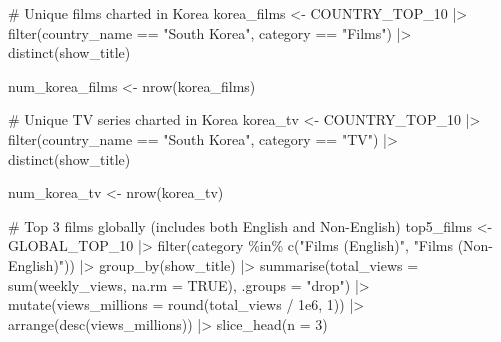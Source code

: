 \documentclass[
  12pt,
  letterpaper,
  DIV=11,
  numbers=noendperiod]{scrartcl}
\newenvironment{Shaded}{\begin{snugshade}}{\end{snugshade}}
\newcommand{\AttributeTok}[1]{\textcolor[rgb]{0.40,0.45,0.13}{#1}}
\newcommand{\CommentTok}[1]{\textcolor[rgb]{0.37,0.37,0.37}{#1}}
\newcommand{\ConstantTok}[1]{\textcolor[rgb]{0.56,0.35,0.01}{#1}}
\newcommand{\DecValTok}[1]{\textcolor[rgb]{0.68,0.00,0.00}{#1}}
\newcommand{\FloatTok}[1]{\textcolor[rgb]{0.68,0.00,0.00}{#1}}
\newcommand{\FunctionTok}[1]{\textcolor[rgb]{0.28,0.35,0.67}{#1}}
\newcommand{\NormalTok}[1]{\textcolor[rgb]{0.00,0.23,0.31}{#1}}
\newcommand{\OtherTok}[1]{\textcolor[rgb]{0.00,0.23,0.31}{#1}}
\newcommand{\SpecialCharTok}[1]{\textcolor[rgb]{0.37,0.37,0.37}{#1}}
\newcommand{\StringTok}[1]{\textcolor[rgb]{0.13,0.47,0.30}{#1}}
\begin{document}
\begin{Shaded}
\begin{Highlighting}[]
\CommentTok{\# Unique films charted in Korea}
\NormalTok{korea\_films }\OtherTok{\textless{}{-}}\NormalTok{ COUNTRY\_TOP\_10 }\SpecialCharTok{|\textgreater{}}
  \FunctionTok{filter}\NormalTok{(country\_name }\SpecialCharTok{==} \StringTok{"South Korea"}\NormalTok{, category }\SpecialCharTok{==} \StringTok{"Films"}\NormalTok{) }\SpecialCharTok{|\textgreater{}}
  \FunctionTok{distinct}\NormalTok{(show\_title)}

\NormalTok{num\_korea\_films }\OtherTok{\textless{}{-}} \FunctionTok{nrow}\NormalTok{(korea\_films)}

\CommentTok{\# Unique TV series charted in Korea}
\NormalTok{korea\_tv }\OtherTok{\textless{}{-}}\NormalTok{ COUNTRY\_TOP\_10 }\SpecialCharTok{|\textgreater{}}
  \FunctionTok{filter}\NormalTok{(country\_name }\SpecialCharTok{==} \StringTok{"South Korea"}\NormalTok{, category }\SpecialCharTok{==} \StringTok{"TV"}\NormalTok{) }\SpecialCharTok{|\textgreater{}}
  \FunctionTok{distinct}\NormalTok{(show\_title)}

\NormalTok{num\_korea\_tv }\OtherTok{\textless{}{-}} \FunctionTok{nrow}\NormalTok{(korea\_tv)}


\CommentTok{\# Top 3 films globally (includes both English and Non{-}English)}
\NormalTok{top5\_films }\OtherTok{\textless{}{-}}\NormalTok{ GLOBAL\_TOP\_10 }\SpecialCharTok{|\textgreater{}}
  \FunctionTok{filter}\NormalTok{(category }\SpecialCharTok{\%in\%} \FunctionTok{c}\NormalTok{(}\StringTok{"Films (English)"}\NormalTok{, }\StringTok{"Films (Non{-}English)"}\NormalTok{)) }\SpecialCharTok{|\textgreater{}}
  \FunctionTok{group\_by}\NormalTok{(show\_title) }\SpecialCharTok{|\textgreater{}}
  \FunctionTok{summarise}\NormalTok{(}\AttributeTok{total\_views =} \FunctionTok{sum}\NormalTok{(weekly\_views, }\AttributeTok{na.rm =} \ConstantTok{TRUE}\NormalTok{), }\AttributeTok{.groups =} \StringTok{"drop"}\NormalTok{) }\SpecialCharTok{|\textgreater{}}
  \FunctionTok{mutate}\NormalTok{(}\AttributeTok{views\_millions =} \FunctionTok{round}\NormalTok{(total\_views }\SpecialCharTok{/} \FloatTok{1e6}\NormalTok{, }\DecValTok{1}\NormalTok{)) }\SpecialCharTok{|\textgreater{}}
  \FunctionTok{arrange}\NormalTok{(}\FunctionTok{desc}\NormalTok{(views\_millions)) }\SpecialCharTok{|\textgreater{}}
  \FunctionTok{slice\_head}\NormalTok{(}\AttributeTok{n =} \DecValTok{3}\NormalTok{)}


\end{Highlighting}
\end{Shaded}
\end{document}
